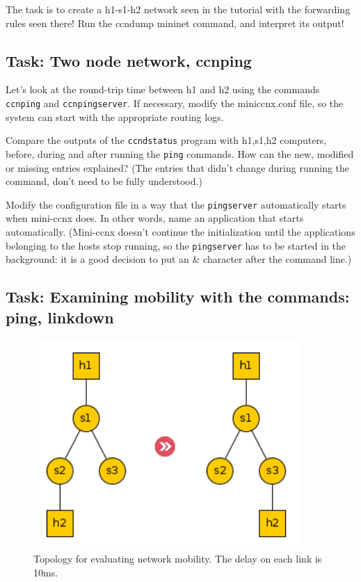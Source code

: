 \documentclass[a4paper]{article}
\begin{document}
The task is to create a h1-s1-h2 network seen in the tutorial with the forwarding rules seen there! Run the
ccndump mininet command, and interpret its output!

\subsection{Task: Two node network, ccnping}

Let's look at the round-trip time between h1 and h2 using the commands \verb!ccnping! and \verb!ccnpingserver!.
If necessary, modify the miniccnx.conf file, so the system can start with the appropriate routing logs.

Compare the outputs of the \verb!ccndstatus! program with h1,s1,h2 computers, before, during and after running
the \verb!ping! commands. How can the new, modified or missing entries explained? (The entries that didn't
change during running the command, don't need to be fully understood.)

Modify the configuration file in a way that the \verb!pingserver! automatically starts when mini-ccnx does.
In other words, name an application that starts automatically. (Mini-ccnx doesn't continue the 
initialization until the applications belonging to the hosts stop running, so the \verb!pingserver! has to
be started in the background: it is a good decision to put an \& character after the command line.)

\subsection{Task: Examining mobility with the commands: ping, linkdown}

\begin{figure}[H]
    \centering
    \includegraphics[width=0.9\textwidth]{figures/unnamed0.png}
    \caption{Topology for evaluating network mobility. The delay on each link is 10ms.}
    \label{fig:CCN-topo}
\end{figure}
\end{document}
